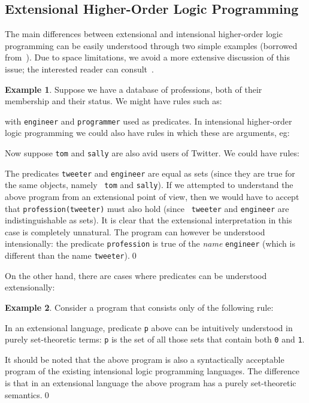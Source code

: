 \documentclass[submission,copyright]{eptcs}
\theoremstyle{definition}
\newtheorem{example}{Example}
\begin{document}
\subsection{Extensional Higher-Order Logic Programming}
The main differences between extensional and intensional higher-order logic programming 
can be easily understood through two simple examples (borrowed from~\cite{CharalambidisHRW13}).
Due to space limitations, we avoid a more extensive discussion of this issue; the interested
reader can consult~\cite{CharalambidisHRW13}.
\begin{example}\label{intensional-predicate}
Suppose we have a database of professions, both of their membership
and their status. We might have rules such as:

with {\tt engineer} and {\tt programmer} used as predicates. In
intensional higher-order logic programming we could also have rules
in which these are arguments, eg:

Now suppose {\tt tom} and {\tt sally} are also avid users of
Twitter. We could have rules:

The predicates {\tt tweeter} and {\tt engineer} are
equal as sets (since they are true for the same objects, namely {\tt
tom} and {\tt sally}). If we attempted to understand the above
program from an extensional point of view, then we would have to
accept that {\tt profession(tweeter)} must also hold (since {\tt
tweeter} and {\tt engineer} are indistinguishable as sets). It is
clear that the extensional interpretation in this case is completely
unnatural. The program can however be understood intensionally: the
predicate {\tt profession} is true of the {\em name} {\tt engineer}
(which is different than the name {\tt tweeter}).\qed
\end{example}
On the other hand, there are cases where predicates can be
understood extensionally:
\begin{example}\label{extensional-predicate}
Consider a program that consists only of the following rule:

In an extensional language, predicate {\tt p} above can be
intuitively understood in purely set-theoretic terms: {\tt p} is the
set of all those sets that contain both {\tt 0} and {\tt 1}.

It should be noted that the above program is also a syntactically
acceptable program of the existing intensional logic programming
languages. The difference is that in an extensional language the
above program has a purely set-theoretic semantics.\qed
\end{example}
\end{document}

